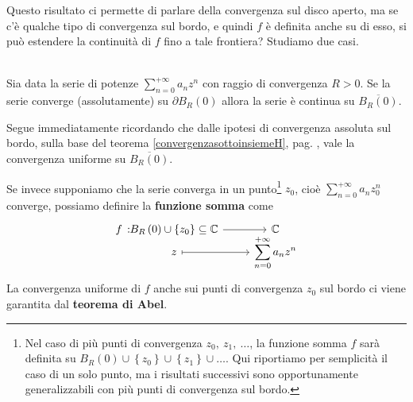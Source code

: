 Questo risultato ci permette di parlare della convergenza sul disco aperto, ma se c'è qualche tipo di convergenza sul bordo, e quindi $f$ è definita anche su di esso, si può estendere la continuità di $f$ fino a tale frontiera? Studiamo due casi.
\begin{corollary}~{}\\
	Sia data la serie di potenze $\displaystyle\sum_{n=0}^{+\infty}a_nz^n$ con raggio di convergenza $R>0$. Se la serie converge (assolutamente) su $\partial B_R\left(0\right)$ allora la serie è continua su $\overline{B_R\left(0\right)}$.
\end{corollary}
\begin{demonstration}
	Segue immediatamente ricordando che dalle ipotesi di convergenza assoluta sul bordo, sulla base del teorema \ref{convergenzasottoinsiemeH}, pag. \pageref{convergenzasottoinsiemeH}, vale la convergenza uniforme su $\overline{B_R\left(0\right)}$.
\end{demonstration}
Se invece supponiamo che la serie converga in un punto\footnote{Nel caso di più punti di convergenza $z_0,\ z_1,\ \ldots$, la funzione somma $f$ sarà definita su $B_R\left(0\right)\cup\left\{z_0\right\}\cup\left\{z_1\right\}\cup\ldots$. Qui riportiamo per semplicità il caso di un solo punto, ma i risultati successivi sono opportunamente generalizzabili con più punti di convergenza sul bordo.} $z_0$, cioè $\displaystyle\sum_{n=0}^{+\infty}a_nz_0^n$ converge, possiamo definire la \textbf{funzione somma} come
\begin{equation}
	\funztot{f}{B_R\left(0\right)\cup\left\{z_0\right\}\subseteq\complexset}{\complexset}{z}{\displaystyle\sum_{n=0}^{+\infty}a_nz^n}
\end{equation}
La convergenza uniforme di $f$ anche sui punti di convergenza $z_0$ sul bordo ci viene garantita dal \textbf{teorema di Abel}.
